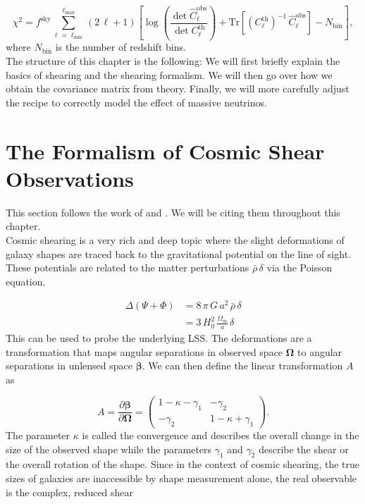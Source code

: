 \documentclass[../main.tex]{subfiles}
\begin{document}
\begin{equation}
    \chi^2 = f^\mathrm{sky} \sum_{\ell=\ell_\mathrm{min}}^{\ell_\mathrm{max}} (2\,\ell+1)\left[\log\left(\frac{\det \hat{C}_\ell^\mathrm{obs}}{\det C_\ell^\mathrm{th}}\right) + \mathrm{Tr}\left[\left(C_\ell^\mathrm{th}\right)^{-1}\,\hat{C}^\mathrm{obs}_\ell\right]-N_\mathrm{bin}\right],
\end{equation}
where $N_\mathrm{bin}$ is the number of redshift bins.\\
The structure of this chapter is the following: We will first briefly explain the basics of shearing and the shearing formalism. We will then go over how we obtain the covariance matrix from theory. Finally, we will more carefully adjust the recipe to correctly model the effect of massive neutrinos.

\section{The Formalism of Cosmic Shear Observations}
This section follows the work of \cite{Kilbinger_2015} and \cite{Sprenger:2018tdb}. We will be citing them throughout this chapter.\\
Cosmic shearing is a very rich and deep topic where the slight deformations of galaxy shapes are traced back to the gravitational potential on the line of sight. These potentials are related to the matter perturbations $\bar{\rho}\,\delta$ via the Poisson equation.

\begin{align*}
    \Delta (\Psi+\Phi) &= 8\,\pi\, G\,a^2\,\bar{\rho}\,\delta\\
                       &= 3\, H_0^2\, \frac{\Omega_m}{a}\, \delta
\end{align*}
This can be used to probe the underlying LSS. The deformations are a transformation that maps angular separations in observed space $\boldsymbol{\Omega}$ to angular separations in unlensed space $\boldsymbol{\beta}$. We can then define the linear transformation $A$ as 

\begin{equation}
    A = \frac{\partial \boldsymbol{\beta}}{\partial \boldsymbol{\Omega}} = \left(\begin{array}{cc}
        1-\kappa-\gamma_1 & -\gamma_2\\
        -\gamma_2 & 1-\kappa+\gamma_1        
    \end{array} \right).
\end{equation}
The parameter $\kappa$ is called the convergence and describes the overall change in the size of the observed shape while the parameters $\gamma_1$ and $\gamma_2$ describe the shear or the overall rotation of the shape. Since in the context of cosmic shearing, the true sizes of galaxies are inaccessible by shape measurement alone, the real observable is the complex, reduced shear 
\end{document}
